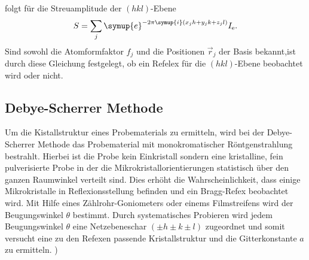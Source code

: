 folgt für die Streuamplitude der $(hkl)$-Ebene
\begin{align}
  S=\sum_j \symup{e}^{-2\pi \symup{i}(x_jh+y_jk+z_jl)}  I_\mathrm{e}. \label{eqn:Streu}
\end{align}
Sind sowohl die Atomformfaktor $f_j$ und die Positionen $\vec{r}_j$ der Basis bekannt,ist durch diese Gleichung festgelegt,
ob ein Refelex für die $(hkl)$-Ebene beobachtet wird oder nicht.

\subsection{Debye-Scherrer Methode}
\label{subsec:Methoden}
Um die Kistallstruktur eines Probematerials
zu ermitteln, wird bei der Debye-Scherrer Methode
das Probematerial mit monokromatischer
Röntgenstrahlung bestrahlt.
Hierbei ist die Probe kein
Einkristall sondern eine
kristalline, fein pulverisierte Probe
in der die Mikrokristallorientierungen statistisch
über den ganzen Raumwinkel verteilt sind.
Dies erhöht die Wahrscheinlichkeit, dass
einige Mikrokristalle in Reflexionsstellung
befinden und ein Bragg-Refex beobachtet wird.
Mit Hilfe eines
Zählrohr-Goniometers oder
einems Filmstreifens wird der Beugungswinkel $\theta$
bestimmt. Durch systematisches Probieren wird
jedem Beugungswinkel $\theta$ eine Netzebeneschar
${(\pm h \pm k \pm l)}$ zugeordnet und somit versucht
eine zu den Refexen passende Kristallstruktur und die Gitterkonstante $a$
zu ermitteln.
\cite{sample})
